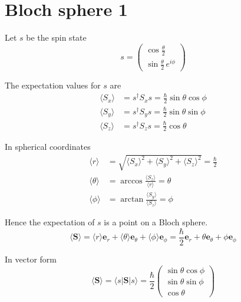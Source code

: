 

\section*{Bloch sphere 1}

Let $s$ be the spin state
\begin{equation*}
s=\begin{pmatrix}
\cos\frac{\theta}{2}
\\[1ex]
\sin\frac{\theta}{2}\,e^{i\phi}
\end{pmatrix}
\end{equation*}

The expectation values for $s$ are
\begin{align*}
\langle S_x\rangle&=s^\dagger S_xs=\frac{\hbar}{2}\sin\theta\cos\phi
\\[1ex]
\langle S_y\rangle&=s^\dagger S_ys=\frac{\hbar}{2}\sin\theta\sin\phi
\\[1ex]
\langle S_z\rangle&=s^\dagger S_zs=\frac{\hbar}{2}\cos\theta
\end{align*}

In spherical coordinates
\begin{align*}
\langle r\rangle&=\sqrt{\langle S_x\rangle^2+\langle S_y\rangle^2+\langle S_z\rangle^2}=\frac{\hbar}{2}
\\
\langle\theta\rangle&=\arccos\frac{\langle S_z\rangle}{\langle r\rangle}=\theta
\\
\langle\phi\rangle&=\arctan\frac{\langle S_y\rangle}{\langle S_z\rangle}=\phi
\end{align*}

Hence the expectation of $s$ is a point on a Bloch sphere.
\begin{equation*}
\langle\mathbf S\rangle
=\langle r\rangle\mathbf e_r
+\langle\theta\rangle\mathbf e_\theta
+\langle\phi\rangle\mathbf e_\phi
=\frac{\hbar}{2}\mathbf e_r
+\theta\mathbf e_\theta
+\phi\mathbf e_\phi
\end{equation*}

\iffalse

In vector form
\begin{equation*}
\langle\mathbf S\rangle=\langle s|\mathbf S|s\rangle
=\frac{\hbar}{2}\begin{pmatrix}
\sin\theta\cos\phi
\\
\sin\theta\sin\phi
\\
\cos\theta
\end{pmatrix}
\end{equation*}

